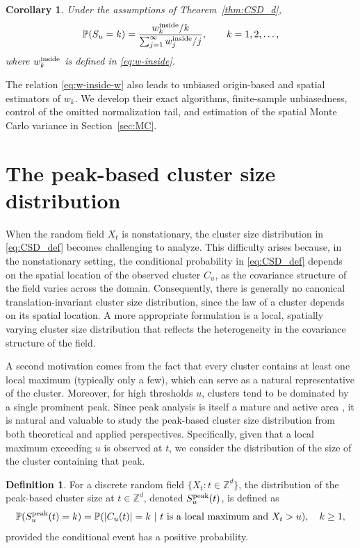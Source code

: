 \documentclass[aap,preprint]{imsart}
\theoremstyle{plain}
\newtheorem{corollary}[theorem]{Corollary}
\theoremstyle{definition}
\newtheorem{definition}[theorem]{Definition}
\def\P{{\mathbb P}}
\def\Z{{\mathbb Z}}
\begin{document}
	\begin{corollary}\label{cor:CSD_d}
		Under the assumptions of Theorem~\ref{thm:CSD_d},
		\[
		\P(S_u=k)
		=
		\frac{w_k^{\rm inside}/k}
		{\sum_{j=1}^{\infty}w_j^{\rm inside}/j},
		\qquad k=1,2,\ldots,
		\]
		where $w_k^{\rm inside}$ is defined in \eqref{eq:w-inside}.
	\end{corollary}
	
	The relation \eqref{eq:w-inside-w} also leads to unbiased origin-based and
	spatial estimators of $w_k$. We develop their exact algorithms,
	finite-sample unbiasedness, control of the omitted normalization tail, and
	estimation of the spatial Monte Carlo variance in Section~\ref{sec:MC}.
	
	\section{The peak-based cluster size distribution}\label{sec:peak-based-cluster}
	When the random field $X_t$ is nonstationary, the cluster size distribution in \eqref{eq:CSD_def} becomes challenging to analyze. This difficulty arises because, in the nonstationary setting, the conditional probability in \eqref{eq:CSD_def} depends on the spatial location of the observed cluster $C_u$, as the covariance structure of the field varies across the domain. Consequently, there is generally no canonical translation-invariant cluster size distribution, since the law of a cluster depends on its spatial location. A more appropriate formulation is a local, spatially varying cluster size distribution that reflects the heterogeneity in the covariance structure of the field. 
	
	A second motivation comes from the fact that every cluster contains at least one local maximum (typically only a few), which can serve as a natural representative of the cluster. Moreover, for high thresholds $u$, clusters tend to be dominated by a single prominent peak. Since peak analysis is itself a mature and active area \cite{Cheng:2020,CS15,CS18,CS17,Fondeville:2018,Huser:2014}, it is natural and valuable to study the peak-based cluster size distribution from both theoretical and applied perspectives. Specifically, given that a local maximum exceeding $u$ is observed at $t$, we consider the distribution of the size of the cluster containing that peak. 
	
		\begin{definition}\label{def:peak-cluster-size} For a discrete random field $\{X_t: t\in \Z^d\}$, the distribution of the peak-based cluster size at $t\in \Z^d$, denoted $S_u^{\rm peak}(t)$, is defined as 
		\begin{equation}\label{eq:CSD_peak_1}
			\begin{split}
				\P(S_u^{\rm peak}(t)=k) = \P( |C_u(t)|=k \ | \ t \ \text{\rm is a local maximum and } X_t>u), \quad k\ge 1,
			\end{split}
		\end{equation}
		provided the conditional event has a positive probability. 
	\end{definition}
	
\end{document}
